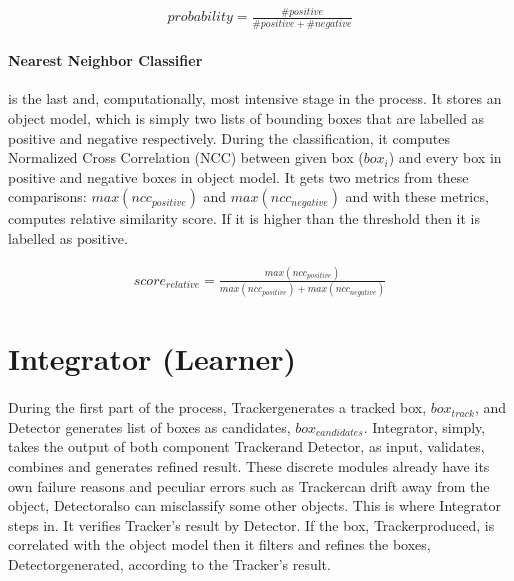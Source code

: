 \documentclass{report}
\newcommand{\Tracker}{Tracker}
\newcommand{\Detector}{Detector}
\begin{document}
            \begin{gather}
                probability = \frac {\# positive} {\# positive + \# negative}
            \end{gather}


        \paragraph{Nearest Neighbor Classifier} is the last and, computationally, most intensive stage in the process.
            It stores an object model, which is simply two lists of bounding boxes that are labelled
            as positive and negative respectively. During the classification,
            it computes Normalized Cross Correlation (NCC) between given box ($box_{i}$) and every box in positive and
            negative boxes in object model. It gets two metrics from these comparisons: $max(ncc_{positive})$ and $max(ncc_{negative})$ and
            with these metrics, computes relative similarity score. If it is higher than the threshold then it is labelled as positive.

            \begin{gather}
                score_{relative} = \frac {max(ncc_{positive})} {max(ncc_{positive}) + max(ncc_{negative})}
            \end{gather}
    \section{Integrator (Learner)}
        \paragraph{}
            During the first part of the process, \Tracker generates a tracked box, $ box_{track} $, and Detector generates list of
            boxes as candidates, $ box_{candidates} $. Integrator, simply, takes the output of
            both component \Tracker and \Detector, as input, validates, combines
            and generates refined result. These discrete modules already have its own failure reasons
            and peculiar errors such as \Tracker can drift away from the object, \Detector also can misclassify some other objects.
            This is where Integrator steps in. It verifies \Tracker's result by \Detector.
            If the box, \Tracker produced, is correlated with the object model then it filters and refines the boxes,
            \Detector generated, according to the \Tracker's result.
\end{document}
